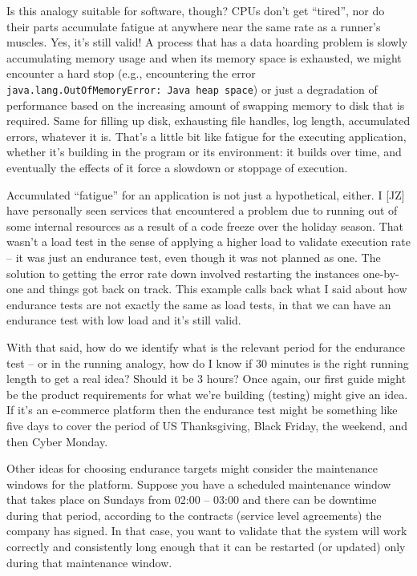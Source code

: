Is this analogy suitable for software, though? CPUs don't get ``tired'', nor do their parts accumulate fatigue at anywhere near the same rate as a runner's muscles. Yes, it's still valid! A process that has a data hoarding problem is slowly accumulating memory usage and when its memory space is exhausted, we might encounter a hard stop (e.g., encountering the error \texttt{java.lang.OutOfMemoryError: Java heap space}) or just a degradation of performance based on the increasing amount of swapping memory to disk that is required. Same for filling up disk, exhausting file handles, log length, accumulated errors, whatever it is. That's a little bit like fatigue for the executing application, whether it's building in the program or its environment: it builds over time, and eventually the effects of it force a slowdown or stoppage of execution. 

Accumulated ``fatigue'' for an application is not just a hypothetical, either. I [JZ] have personally seen services that encountered a problem due to running out of some internal resources as a result of a code freeze over the holiday season. That wasn't a load test in the sense of applying a higher load to validate execution rate -- it was just an endurance test, even though it was not planned as one. The solution to getting the error rate down involved restarting the instances one-by-one and things got back on track. This example calls back what I said about how endurance tests are not exactly the same as load tests, in that we can have an endurance test with low load and it's still valid.

With that said, how do we identify what is the relevant period for the endurance test -- or in the running analogy, how do I know if 30 minutes is the right running length to get a real idea? Should it be 3 hours? Once again, our first guide might be the product requirements for what we're building (testing) might give an idea. If it's an e-commerce platform then the endurance test might be something like five days to cover the period of US Thanksgiving, Black Friday, the weekend, and then Cyber Monday. 

Other ideas for choosing endurance targets might consider the maintenance windows for the platform. Suppose you have a scheduled maintenance window that takes place on Sundays from 02:00 -- 03:00 and there can be downtime during that period, according to the contracts (service level agreements) the company has signed. In that case, you want to validate that the system will work correctly and consistently long enough that it can be restarted (or updated) only during that maintenance window. 

